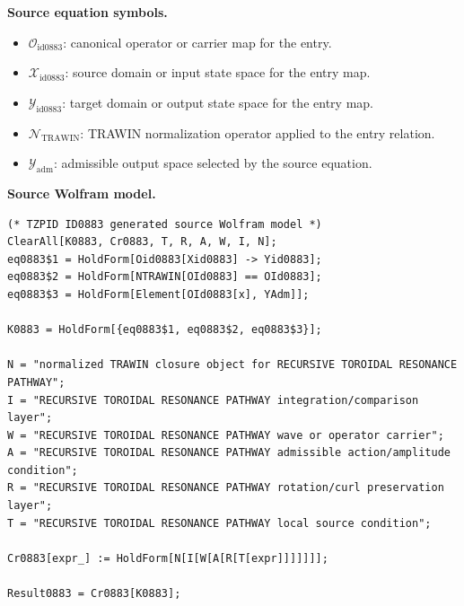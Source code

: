 \begin{minipage}[t]{0.49\linewidth}
\begingroup
\small
\raggedright
\textbf{Source equation symbols.}\par
\begin{itemize}[leftmargin=1.35em,itemsep=1pt,topsep=1pt,parsep=0pt]
    \item $\mathcal{O}_{\mathrm{id0883}}$: canonical operator or carrier map for the entry.
    \item $\mathcal{X}_{\mathrm{id0883}}$: source domain or input state space for the entry map.
    \item $\mathcal{Y}_{\mathrm{id0883}}$: target domain or output state space for the entry map.
    \item $\mathcal{N}_{\mathrm{TRAWIN}}$: TRAWIN normalization operator applied to the entry relation.
    \item $\mathcal{Y}_{\mathrm{adm}}$: admissible output space selected by the source equation.
\end{itemize}
\endgroup
\end{minipage}\hfill
\begin{minipage}[t]{0.47\linewidth}
\begingroup
\scriptsize
\raggedright
\textbf{Source Wolfram model.}\par
\begin{Verbatim}[fontsize=\tiny,breaklines=true,breakanywhere=true]
(* TZPID ID0883 generated source Wolfram model *)
ClearAll[K0883, Cr0883, T, R, A, W, I, N];
eq0883$1 = HoldForm[Oid0883[Xid0883] -> Yid0883];
eq0883$2 = HoldForm[NTRAWIN[OId0883] == OId0883];
eq0883$3 = HoldForm[Element[OId0883[x], YAdm]];

K0883 = HoldForm[{eq0883$1, eq0883$2, eq0883$3}];

N = "normalized TRAWIN closure object for RECURSIVE TOROIDAL RESONANCE PATHWAY";
I = "RECURSIVE TOROIDAL RESONANCE PATHWAY integration/comparison layer";
W = "RECURSIVE TOROIDAL RESONANCE PATHWAY wave or operator carrier";
A = "RECURSIVE TOROIDAL RESONANCE PATHWAY admissible action/amplitude condition";
R = "RECURSIVE TOROIDAL RESONANCE PATHWAY rotation/curl preservation layer";
T = "RECURSIVE TOROIDAL RESONANCE PATHWAY local source condition";

Cr0883[expr_] := HoldForm[N[I[W[A[R[T[expr]]]]]]];

Result0883 = Cr0883[K0883];
\end{Verbatim}
\endgroup
\end{minipage}

